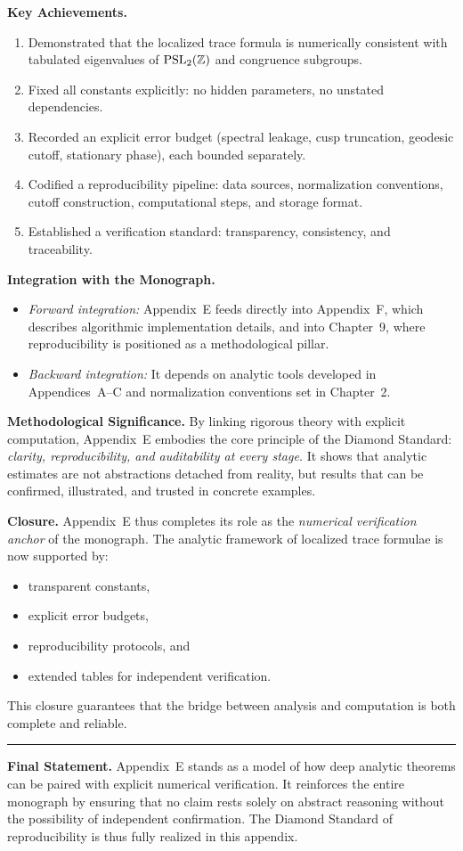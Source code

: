 \medskip
\noindent \textbf{Key Achievements.}
\begin{enumerate}
  \item Demonstrated that the localized trace formula is numerically consistent
  with tabulated eigenvalues of $\operatorname{PSL}_2(\mathbb Z)$ and congruence subgroups.  
  \item Fixed all constants explicitly: no hidden parameters, no unstated
  dependencies.  
  \item Recorded an explicit error budget (spectral leakage, cusp truncation,
  geodesic cutoff, stationary phase), each bounded separately.  
  \item Codified a reproducibility pipeline: data sources, normalization
  conventions, cutoff construction, computational steps, and storage format.  
  \item Established a verification standard: transparency, consistency, and
  traceability.  
\end{enumerate}

\medskip
\noindent \textbf{Integration with the Monograph.}
\begin{itemize}
  \item \emph{Forward integration:} Appendix~E feeds directly into Appendix~F,
  which describes algorithmic implementation details, and into Chapter~9,
  where reproducibility is positioned as a methodological pillar.  
  \item \emph{Backward integration:} It depends on analytic tools developed in
  Appendices~A--C and normalization conventions set in Chapter~2.  
\end{itemize}

\medskip
\noindent \textbf{Methodological Significance.}
By linking rigorous theory with explicit computation, Appendix~E embodies the
core principle of the Diamond Standard: \emph{clarity, reproducibility, and
auditability at every stage.}  
It shows that analytic estimates are not abstractions detached from reality,
but results that can be confirmed, illustrated, and trusted in concrete
examples.

\medskip
\noindent \textbf{Closure.}
Appendix~E thus completes its role as the \emph{numerical verification anchor}
of the monograph. The analytic framework of localized trace formulae is now
supported by:
\begin{itemize}
  \item transparent constants,  
  \item explicit error budgets,  
  \item reproducibility protocols, and  
  \item extended tables for independent verification.  
\end{itemize}
This closure guarantees that the bridge between analysis and computation is
both complete and reliable.

\bigskip
\hrule
\bigskip

\noindent \textbf{Final Statement.}
Appendix~E stands as a model of how deep analytic theorems can be paired with
explicit numerical verification. It reinforces the entire monograph by
ensuring that no claim rests solely on abstract reasoning without the
possibility of independent confirmation.  
The Diamond Standard of reproducibility is thus fully realized in this
appendix.
